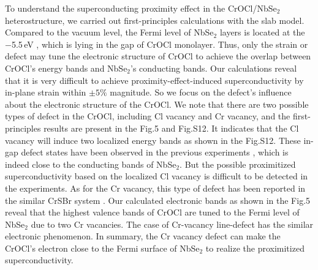 \documentclass[%
 reprint,
superscriptaddress,
 amsmath,amssymb,
 aps,
]{revtex4-2}
\begin{document}
To understand the superconducting proximity effect in the CrOCl/NbSe$_2$ heterostructure, we carried out first-principles calculations with the slab model. Compared to the vacuum level, the Fermi level of NbSe$_2$ layers is located at the $-$5.5\,eV , which is lying in the gap of CrOCl monolayer. Thus, only the strain or defect may tune the electronic structure of CrOCl to achieve the overlap between CrOCl's energy bands and NbSe$_2$'s conducting bands. Our calculations reveal that it is very difficult to achieve proximity-effect-induced superconductivity by in-plane strain within $\pm 5\%$ magnitude. So we focus on the defect's influence about the electronic structure of the CrOCl. We note that there are two possible types of defect in the CrOCl, including Cl vacancy and Cr vacancy, and the first-principles results are present in the Fig.5 and Fig.S12. It indicates that the Cl vacancy will induce two localized energy bands as shown in the Fig.S12. These in-gap defect states have been observed in the previous experiments \cite{CrOCl_APL}, which is indeed close to the conducting bands of NbSe$_2$. But the possible proximitized superconductivity based on the localized Cl vacancy is difficult to be detected in the experiments. As for the Cr vacancy, this type of defect has been reported in the similar CrSBr system \cite{CrSBr}. Our calculated electronic bands as shown in the Fig.5 reveal that the highest valence bands of CrOCl are tuned to the Fermi level of NbSe$_2$ due to two Cr vacancies. The case of Cr-vacancy line-defect has the similar electronic phenomenon. In summary, the Cr vacancy defect can make the CrOCl's electron close to the Fermi surface of NbSe$_2$ to realize the proximitized superconductivity. 

\end{document}
